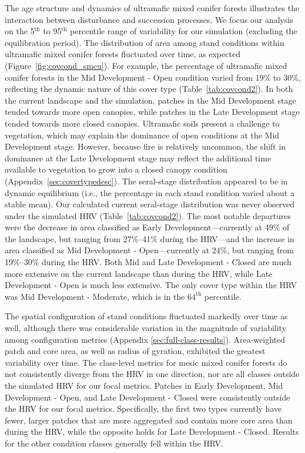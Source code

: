 The age structure and dynamics of ultramafic mixed conifer forests illustrates the interaction between disturbance and succession processes. We focus our analysis on the 5$^{\text{th}}$ to 95$^{\text{th}}$ percentile range of variability for our simulation (excluding the equilibration period). %
%
The distribution of area among stand conditions within ultramafic mixed conifer forests fluctuated over time, as expected (Figure~\ref{fig:covcond_smcu}). For example, the percentage of ultramafic mixed conifer forests in the Mid Development - Open condition varied from 19\% to 30\%, reflecting the dynamic nature of this cover type (Table~\ref{tab:covcond2}). In both the current landscape and the simulation, patches in the Mid Development stage tended towards more open canopies, while patches in the Late Development stage tended towards more closed canopies. Ultramafic soils present a challenge to vegetation, which may explain the dominance of open conditions at the Mid Development stage. However, because fire is relatively uncommon, the shift in dominance at the Late Development stage may reflect the additional time available to vegetation to grow into a closed canopy condition (Appendix~\ref{sec:covertypedesc}). %
%
The seral-stage distribution appeared to be in dynamic equilibrium (i.e., the percentage in each stand condition varied about a stable mean). Our calculated current seral-stage distribution was never observed under the simulated HRV (Table~\ref{tab:covcond2}). The most notable departures were the decrease in area classified as Early Development---currently at 49\% of the landscape, but ranging from 27\%--41\% during the HRV---and the increase in area classified as Mid Development - Open---currently at 24\%, but ranging from 19\%--30\% during the HRV. Both Mid and Late Development - Closed are much more extensive on the current landscape than during the HRV, while Late Development - Open is much less extensive. The only cover type within the HRV was Mid Development - Moderate, which is in the $64^{\text{th}}$ percentile.

The spatial configuration of stand conditions fluctuated markedly over time as well, although there was considerable variation in the magnitude of variability among configuration metrics (Appendix \ref{sec:full-class-results}). Area-weighted patch and core area, as well as radius of gyration, exhibited the greatest variability over time. The class-level metrics for mesic mixed conifer forests do not consistently diverge from the HRV in one direction, nor are all classes outside the simulated HRV for our focal metrics. Patches in Early Development, Mid Development - Open, and Late Development - Closed were consistently outside the HRV for our focal metrics. Specifically, the first two types currently have fewer, larger patches that are more aggregated and contain more core area than during the HRV, while the opposite holds for Late Development - Closed. Results for the other condition classes generally fell within the HRV.

